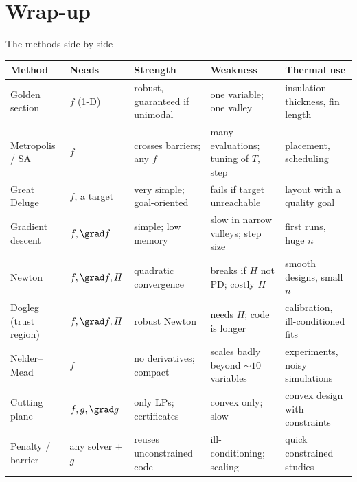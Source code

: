 
\section{Wrap-up}

\begin{frame}{The methods side by side}
  \centering\scriptsize
  \begin{tabular}{p{2.5cm}p{2.4cm}p{3.4cm}p{3.6cm}p{2.5cm}}
    \toprule
    \textbf{Method} & \textbf{Needs} & \textbf{Strength} & \textbf{Weakness} & \textbf{Thermal use}\\
    \midrule
    Golden section & $f$ (1-D) & robust, guaranteed if unimodal & one variable; one valley & insulation thickness, fin length\\
    Metropolis / SA & $f$ & crosses barriers; any $f$ & many evaluations; tuning of $T$, step & placement, scheduling\\
    Great Deluge & $f$, a target & very simple; goal-oriented & fails if target unreachable & layout with a quality goal\\
    Gradient descent & $f,\grad f$ & simple; low memory & slow in narrow valleys; step size & first runs, huge $n$\\
    Newton & $f,\grad f,H$ & quadratic convergence & breaks if $H$ not PD; costly $H$ & smooth designs, small $n$\\
    Dogleg (trust region) & $f,\grad f,H$ & robust Newton & needs $H$; code is longer & calibration, ill-conditioned fits\\
    Nelder--Mead & $f$ & no derivatives; compact & scales badly beyond $\sim\!10$ variables & experiments, noisy simulations\\
    Cutting plane & $f,g,\grad g$ & only LPs; certificates & convex only; slow & convex design with constraints\\
    Penalty / barrier & any solver + $g$ & reuses unconstrained code & ill-conditioning; scaling & quick constrained studies\\
    \bottomrule
  \end{tabular}
\end{frame}

